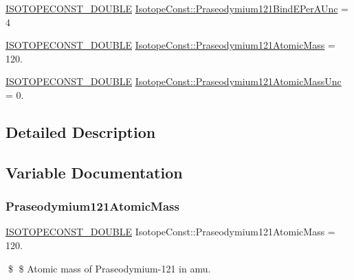 \begin{DoxyCompactItemize}
\item 
\mbox{\hyperlink{group___isotope_const-_macros_ga8f45a7272ce02c0b4c65c44636ed719a}{I\+S\+O\+T\+O\+P\+E\+C\+O\+N\+S\+T\+\_\+\+D\+O\+U\+B\+LE}} \mbox{\hyperlink{group___isotope_const-_praseodymium-_pr121_gafa40f1db0c3417d1410114f5d00920b7}{Isotope\+Const\+::\+Praseodymium121\+Bind\+E\+Per\+A\+Unc}} = 4
\item 
\mbox{\hyperlink{group___isotope_const-_macros_ga8f45a7272ce02c0b4c65c44636ed719a}{I\+S\+O\+T\+O\+P\+E\+C\+O\+N\+S\+T\+\_\+\+D\+O\+U\+B\+LE}} \mbox{\hyperlink{group___isotope_const-_praseodymium-_pr121_gadad6ac8a8161820a089998bc8d7dc647}{Isotope\+Const\+::\+Praseodymium121\+Atomic\+Mass}} = 120.
\item 
\mbox{\hyperlink{group___isotope_const-_macros_ga8f45a7272ce02c0b4c65c44636ed719a}{I\+S\+O\+T\+O\+P\+E\+C\+O\+N\+S\+T\+\_\+\+D\+O\+U\+B\+LE}} \mbox{\hyperlink{group___isotope_const-_praseodymium-_pr121_gaf9ecb4601cd84ee460739d979708181d}{Isotope\+Const\+::\+Praseodymium121\+Atomic\+Mass\+Unc}} = 0.
\end{DoxyCompactItemize}


\subsection{Detailed Description}


\subsection{Variable Documentation}
\mbox{\label{group___isotope_const-_praseodymium-_pr121_gadad6ac8a8161820a089998bc8d7dc647}} 
\subsubsection{\texorpdfstring{Praseodymium121\+Atomic\+Mass}{Praseodymium121AtomicMass}}
{\footnotesize\ttfamily \mbox{\hyperlink{group___isotope_const-_macros_ga8f45a7272ce02c0b4c65c44636ed719a}{I\+S\+O\+T\+O\+P\+E\+C\+O\+N\+S\+T\+\_\+\+D\+O\+U\+B\+LE}} Isotope\+Const\+::\+Praseodymium121\+Atomic\+Mass = 120.}

\$ \$ Atomic mass of Praseodymium-\/121 in amu. \mbox{\label{group___isotope_const-_praseodymium-_pr121_gaf9ecb4601cd84ee460739d979708181d}} 
